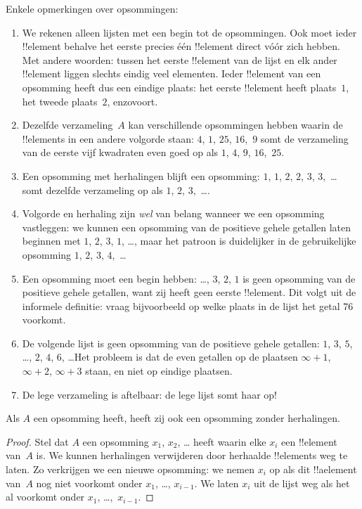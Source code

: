 \documentclass[../../../include/open-logic-section]{subfiles}
\begin{document}
\begin{explain}
Enkele opmerkingen over opsommingen:
\begin{enumerate}
\item We rekenen alleen lijsten met een begin tot de opsommingen. Ook
  moet ieder !!{element} behalve het eerste precies één !!{element}
  direct vóór zich hebben. Met andere woorden: tussen het eerste
  !!{element} van de lijst en elk ander !!{element} liggen slechts
  eindig veel elementen. Ieder !!{element} van een opsomming heeft dus
  een eindige plaats: het eerste !!{element} heeft plaats~$1$, het
  tweede plaats~$2$, enzovoort.
\item Dezelfde verzameling~$A$ kan verschillende opsommingen hebben
  waarin de !!{element}s in een andere volgorde staan: $4$, $1$,
  $25$, $16$,~$9$ somt de verzameling van de eerste vijf kwadraten
  even goed op als $1$, $4$, $9$, $16$,~$25$.
\item Een opsomming met herhalingen blijft een opsomming: $1$, $1$, $2$,
  $2$, $3$, $3$,~\dots{} somt dezelfde verzameling op als $1$, $2$,
  $3$,~\dots{}.
\item Volgorde en herhaling zijn \emph{wel} van belang wanneer we een
  opsomming vastleggen: we kunnen een opsomming van de positieve gehele
  getallen laten beginnen met $1$, $2$, $3$, $1$, \dots{}, maar het patroon is duidelijker in
  de gebruikelijke opsomming $1$, $2$, $3$, $4$,~\dots
\item Een opsomming moet een begin hebben: \dots, $3$, $2$, $1$ is geen
  opsomming van de positieve gehele getallen, want zij heeft geen eerste
  !!{element}. Dit volgt uit de informele definitie: vraag bijvoorbeeld
  op welke plaats in de lijst het getal 76 voorkomt.
\item De volgende lijst is geen opsomming van de positieve gehele getallen:
  $1$, $3$, $5$, \dots, $2$, $4$, $6$, \dots\@ Het probleem is dat de
  even getallen op de plaatsen $\infty + 1$, $\infty + 2$, $\infty +
  3$ staan, en niet op eindige plaatsen.
\item De lege verzameling is aftelbaar: de lege lijst somt haar op!{}
\end{enumerate}
\end{explain}

\begin{prop}
  Als $A$ een opsomming heeft, heeft zij ook een opsomming zonder
  herhalingen.
\end{prop}

\begin{proof}
  Stel dat $A$ een opsomming $x_1$, $x_2$, \dots{} heeft waarin elke
  $x_i$ een !!{element} van~$A$ is. We kunnen herhalingen verwijderen
  door herhaalde !!{element}s weg te laten. Zo verkrijgen we een nieuwe
  opsomming: we nemen $x_i$ op als dit !!a{element} van~$A$ nog niet
  voorkomt onder $x_1$, \dots, $x_{i-1}$. We laten $x_i$ uit de lijst
  weg als het al voorkomt onder $x_1$, \dots,~$x_{i-1}$.
\end{proof}
\end{document}
